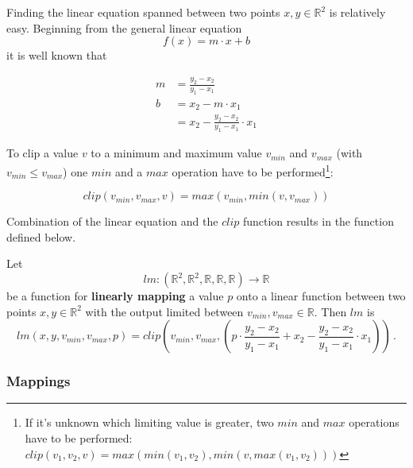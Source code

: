 Finding the linear equation spanned between two points $x, y \in \mathbb{R}^2$ is relatively easy. Beginning from the general linear equation
\begin{equation*}
f(x) = m \cdot x + b
\end{equation*}
it is well known that

\begin{align*}
m &= \frac{y_2 - x_2}{y_1 - x_1} \\
b &= x_2 - m \cdot x_1  \\
&= x_2 - \frac{y_2 - x_2}{y_1 - x_1} \cdot x_1
\end{align*}

To clip a value $v$ to a minimum and maximum value $v_{min}$ and $v_{max}$ (with $v_{min} \leq v_{max}$) one $min$ and a $max$ operation have to be performed\footnote{If it's unknown which limiting value is greater, two $min$ and $max$ operations have to be performed: $clip(v_1, v_2, v) = max(min(v_1, v_2), min(v, max(v_1, v_2)))$}:

\begin{equation*}
clip(v_{min}, v_{max}, v) = max(v_{min}, min(v, v_{max}))
\end{equation*}

Combination of the linear equation and the $clip$ function results in the function defined below.

\begin{defn} Let 
	\begin{equation*}
	lm : (\mathbb{R}^2, \mathbb{R}^2, \mathbb{R}, \mathbb{R}, \mathbb{R}) \rightarrow \mathbb{R}
	\end{equation*}
be a function for \textbf{linearly mapping} a value $p$ onto a linear function between two points $x, y \in \mathbb{R}^2$ with the output limited between $v_{min}, v_{max} \in \mathbb{R}$. Then $lm$ is
\begin{equation}
\label{eq:lm}
lm(x, y, v_{min}, v_{max}, p) = clip\left(v_{min}, v_{max}, \left( p \cdot \frac{y_2 - x_2}{y_1 - x_1} + x_2 - \frac{y_2 - x_2}{y_1 - x_1} \cdot x_1 \right)\right) \, .
\end{equation}
\end{defn}


\subsubsection{Mappings}

